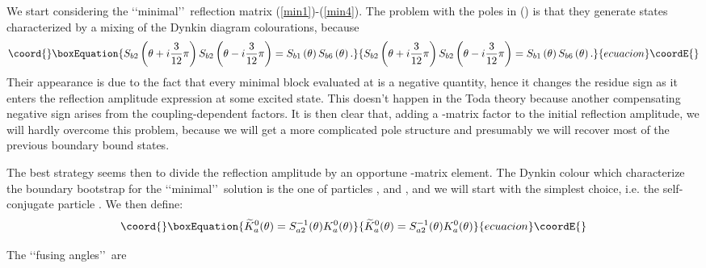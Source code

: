 \documentclass[a4paper,12pt]{report}
\begin{document}
We start considering the \lq\lq minimal\rq\rq \, reflection matrix (\ref{min1})-(\ref{min4}). The problem with the
poles \coordHE{} in \coordHE{} (\coordHE{}) is that they
generate states characterized by a mixing of the Dynkin diagram colourations, because
\begin{equation}\coord{}\boxEquation{
S_{b2}\left(\theta+i\frac{3}{12}\pi\right)S_{b2}\left(\theta-i\frac{3}{12}\pi\right)=S_{b1}\left(\theta\right)S_{b6}\left(\theta\right).
}{
S_{b2}\left(\theta+i\frac{3}{12}\pi\right)S_{b2}\left(\theta-i\frac{3}{12}\pi\right)=S_{b1}\left(\theta\right)S_{b6}\left(\theta\right).
}{ecuacion}\coordE{}\end{equation}
Their appearance is due to the fact that every minimal block \coordHE{} evaluated at \coordHE{} is a
negative quantity, hence it changes the residue sign as it enters the reflection amplitude expression at some
excited state. This doesn't happen in the Toda theory because another compensating negative sign arises from the
coupling-dependent factors. It is then clear that, adding a \coordHE{}-matrix factor to the initial reflection amplitude,
we will hardly overcome this problem, because we will get a more complicated pole structure and presumably we
will recover most of the previous boundary bound states.

The best strategy seems then to divide the reflection amplitude by an opportune \coordHE{}-matrix element. The Dynkin
colour which characterize the boundary bootstrap for the \lq\lq minimal\rq\rq \, solution is the one of particles
\coordHE{}, \coordHE{} and \coordHE{}, and we will start with the simplest choice, i.e. the self-conjugate particle \coordHE{}. We then
define:
\begin{equation}\coord{}\boxEquation{\label{E6CDD}
\widetilde{K}_{a}^{0}(\theta)=S_{a2}^{-1}(\theta)K_{a}^{0}(\theta)
}{\widetilde{K}_{a}^{0}(\theta)=S_{a2}^{-1}(\theta)K_{a}^{0}(\theta)
}{ecuacion}\coordE{}\end{equation}

The \lq\lq fusing angles\rq\rq \, are
\end{document}
